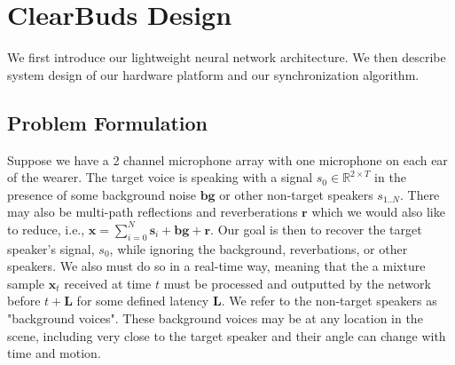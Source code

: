 \documentclass [11pt, proquest] {uwthesis}[2020/02/24]
\begin{document}


\section{ClearBuds Design}

We first introduce our  lightweight  neural network architecture. We then describe system design  of our hardware platform and our synchronization algorithm. %



\subsection{Problem Formulation}
Suppose we have a 2 channel microphone array with one microphone on each ear of the wearer. The target voice is speaking with a signal $s_0 \in \mathbb{R}^{2 \times T}$ in the presence of some background noise $\textbf{bg}$ or other non-target speakers $s_{1..N}$. There may also be multi-path reflections and reverberations $\textbf{r}$ which we would also like to reduce, i.e., $\mathbf{x} = \sum_{i=0}^{N}\mathbf{s}_i + \mathbf{bg} + \mathbf{r}$.  Our goal is then to recover the target speaker's signal, $s_{0}$, while ignoring the background, reverbations, or other speakers. We also must do so in a real-time way, meaning that the a mixture sample $\textbf{x}_t $ received at time $t$ must be processed and outputted by the network before $t + \textbf{L}$ for some defined latency $\textbf{L}$.  We refer to the non-target speakers as "background voices". These background voices may be at any location in the scene, including very close to the target speaker and their angle  can change with time and motion.
\end{document}
